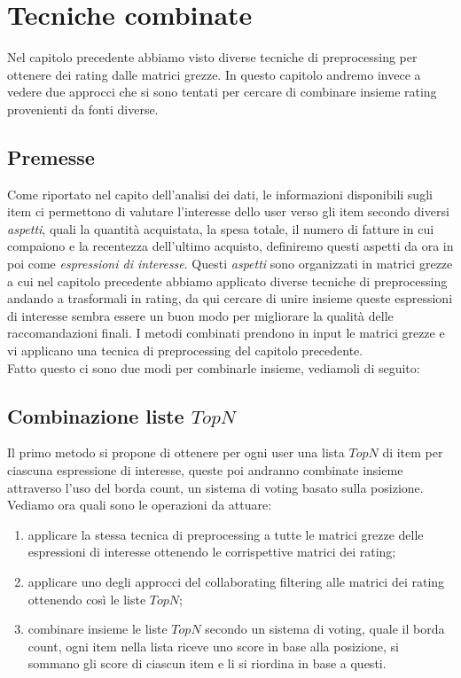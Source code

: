 \hypertarget{(chap:capitolo5)}{}
\chapter{Tecniche combinate}
Nel capitolo precedente abbiamo visto diverse tecniche di preprocessing per ottenere dei rating dalle matrici grezze.
In questo capitolo andremo invece a vedere due approcci che si sono tentati per cercare di combinare insieme rating provenienti da fonti diverse.
\section{Premesse}
Come riportato nel capito dell'analisi dei dati, le informazioni disponibili sugli item ci permettono di valutare l'interesse dello user verso gli item secondo diversi \textit{aspetti}, quali la quantità acquistata, la spesa totale, il numero di fatture in cui compaiono e la recentezza dell'ultimo acquisto, definiremo questi aspetti da ora in poi come \textit{espressioni di interesse}.
Questi \textit{aspetti} sono organizzati in matrici grezze a cui nel capitolo precedente abbiamo applicato diverse tecniche di preprocessing andando a trasformali in rating, da qui cercare di unire insieme queste espressioni di interesse sembra essere un buon modo per migliorare la qualità delle raccomandazioni finali.
I metodi combinati prendono in input le matrici grezze e vi applicano una tecnica di preprocessing del capitolo precedente.\\
Fatto questo ci sono due modi per combinarle insieme, vediamoli di seguito:

\section{Combinazione liste $TopN$}
Il primo metodo si propone di ottenere per ogni user una lista $TopN$ di item per ciascuna espressione di interesse, queste poi andranno combinate insieme attraverso l'uso del borda count, un sistema di voting basato sulla posizione.
Vediamo ora quali sono le operazioni da attuare:
\begin{enumerate}
    \item applicare la stessa tecnica di preprocessing a tutte le matrici grezze delle espressioni di interesse ottenendo le corrispettive matrici dei rating;
    \item applicare uno degli approcci del collaborating filtering alle matrici dei rating ottenendo così le liste $TopN$;
    \item combinare insieme le liste $TopN$ secondo un sistema di voting, quale il borda count, ogni item nella lista riceve uno score in base alla posizione, si sommano gli score di ciascun item e li si riordina in base a questi.
\end{enumerate}

